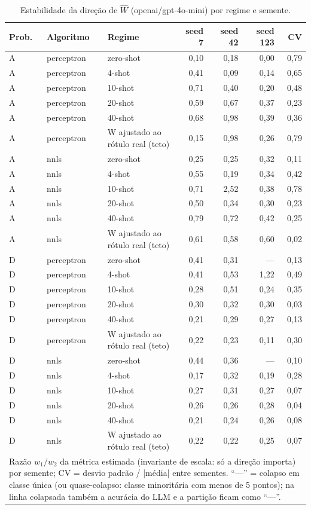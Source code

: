 \begin{table}[htbp]
\centering
\small
\caption{Estabilidade da direção de $\hat{W}$ (openai/gpt-4o-mini) por regime e semente.}
\label{tab:T4_W_gpt4mini}
\begin{tabular}{lllrrrr}
\toprule
Prob. & Algoritmo & Regime & seed 7 & seed 42 & seed 123 & CV \\
\midrule
A & perceptron & zero-shot & 0,10 & 0,18 & 0,00 & 0,79 \\
A & perceptron & 4-shot & 0,41 & 0,09 & 0,14 & 0,65 \\
A & perceptron & 10-shot & 0,71 & 0,40 & 0,20 & 0,48 \\
A & perceptron & 20-shot & 0,59 & 0,67 & 0,37 & 0,23 \\
A & perceptron & 40-shot & 0,68 & 0,98 & 0,39 & 0,36 \\
A & perceptron & W ajustado ao rótulo real (teto) & 0,15 & 0,98 & 0,26 & 0,79 \\
\midrule
A & nnls & zero-shot & 0,25 & 0,25 & 0,32 & 0,11 \\
A & nnls & 4-shot & 0,55 & 0,19 & 0,34 & 0,42 \\
A & nnls & 10-shot & 0,71 & 2,52 & 0,38 & 0,78 \\
A & nnls & 20-shot & 0,50 & 0,34 & 0,30 & 0,23 \\
A & nnls & 40-shot & 0,79 & 0,72 & 0,42 & 0,25 \\
A & nnls & W ajustado ao rótulo real (teto) & 0,61 & 0,58 & 0,60 & 0,02 \\
\midrule
D & perceptron & zero-shot & 0,41 & 0,31 & — & 0,13 \\
D & perceptron & 4-shot & 0,41 & 0,53 & 1,22 & 0,49 \\
D & perceptron & 10-shot & 0,28 & 0,51 & 0,24 & 0,35 \\
D & perceptron & 20-shot & 0,30 & 0,32 & 0,30 & 0,03 \\
D & perceptron & 40-shot & 0,21 & 0,29 & 0,27 & 0,13 \\
D & perceptron & W ajustado ao rótulo real (teto) & 0,22 & 0,23 & 0,11 & 0,30 \\
\midrule
D & nnls & zero-shot & 0,44 & 0,36 & — & 0,10 \\
D & nnls & 4-shot & 0,17 & 0,32 & 0,19 & 0,28 \\
D & nnls & 10-shot & 0,27 & 0,31 & 0,27 & 0,07 \\
D & nnls & 20-shot & 0,26 & 0,26 & 0,28 & 0,04 \\
D & nnls & 40-shot & 0,21 & 0,24 & 0,26 & 0,08 \\
D & nnls & W ajustado ao rótulo real (teto) & 0,22 & 0,22 & 0,25 & 0,07 \\
\bottomrule
\multicolumn{7}{p{0.95\linewidth}}{\footnotesize Razão $w_1/w_2$ da métrica estimada (invariante de escala: só a direção importa) por semente; CV = desvio padrão / |média| entre sementes. ``—'' = colapso em classe única (ou quase-colapso: classe minoritária com menos de 5 pontos); na linha colapsada também a acurácia do LLM e a partição ficam como ``—''.} \\
\end{tabular}
\end{table}
